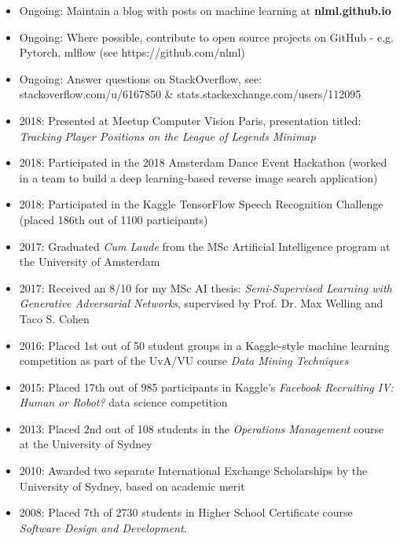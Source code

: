 \documentclass[margin]{res}
\begin{document}
\begin{resume}
		\begin{itemize}
			\item Ongoing: Maintain a blog with posts on machine learning at \textbf{nlml.github.io}
			\item Ongoing: Where possible, contribute to open source projects on GitHub - e.g. Pytorch, mlflow (see https://github.com/nlml)
			\item Ongoing: Answer questions on StackOverflow, see:\\stackoverflow.com/u/6167850 \& stats.stackexchange.com/users/112095
			\item 2018: Presented at Meetup Computer Vision Paris, presentation titled:\\ \emph{Tracking Player Positions on the League of Legends Minimap}
			\item 2018: Participated in the 2018 Amsterdam Dance Event Hackathon (worked in a team to build a deep learning-based reverse image search application)
			\item 2018: Participated in the Kaggle TensorFlow Speech Recognition Challenge (placed 186th out of 1100 participants)
			\item 2017: Graduated {\it Cum Laude} from the MSc Artificial Intelligence program at the University of Amsterdam
			\item 2017: Received an 8/10 for my MSc AI thesis: {\it Semi-Supervised Learning with Generative Adversarial Networks}, supervised by Prof. Dr. Max Welling and Taco S. Cohen
			\item 2016: Placed 1st out of 50 student groups in a Kaggle-style machine learning competition as part of the UvA/VU course \textit{Data Mining Techniques}
			\item 2015: Placed 17th out of 985 participants in Kaggle's {\sl Facebook Recruiting IV: Human or Robot?} data science competition
			\item 2013: Placed 2nd out of 108 students in the \textit{Operations Management} course at the University of Sydney
			\item 2010: Awarded two separate International Exchange Scholarships by the University of Sydney, based on academic merit
			\item 2008: Placed 7th of 2730 students in Higher School Certificate course {\sl Software Design and Development.}
		\end{itemize}
		

\end{resume}
\end{document}
